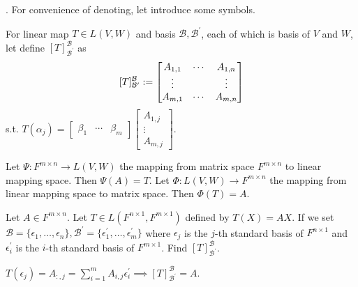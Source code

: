 \documentclass[8pt]{beamer}
\newcommand{\mc}[1]{\mathcal{#1}}
\begin{document}
\begin{frame}{.}
    For convenience of denoting, let introduce some symbols.
    \begin{definition}
        For linear map $T \in L(V,W)$ and basis $\mc{B}, \mc{B}^\prime$, each of which is basis of $V$ and $W$, let define $[T]^{\mc{B}}_{\mc{B}^\prime}$ as
        \[
            [T]^{\mc{B}}_{\mc{B}^\prime} := \left[\begin{matrix}
                A_{1,1} & \cdots & A_{1,n} \\ \vdots & \empty & \vdots \\ A_{m,1} & \cdots & A_{m,n}
            \end{matrix}\right]
        \]
        s.t. $ T(\alpha_j) = \left[\begin{matrix} \beta_1 & \cdots & \beta_m \end{matrix}\right] \left[\begin{matrix}
            A_{1,j} \\ \vdots \\ A_{m,j}
        \end{matrix}\right]$.

        Let $\Psi : F^{m \times n} \to L(V,W)$ the mapping from matrix space $F^{m \times n}$ to linear mapping space. 
        Then $\Psi(A) = T$.
        Let $\Phi : L(V,W) \to F^{m \times n}$ the mapping from linear mapping space to matrix space.
        Then $\Phi(T) = A$.

    \end{definition}
    \begin{example}
        Let $A \in F^{m \times n}$.
        Let $T \in L(F^{n \times 1}, F^{m \times 1})$ defined by $T(X) = AX$.
        If we set $\mc{B} = \{\epsilon_1, \dots, \epsilon_n\}, \mc{B}^\prime = \{\epsilon^\prime_1, \dots, \epsilon^\prime_m\}$ where $\epsilon_j$ is the $j$-th standard basis of $F^{n \times 1}$ and $\epsilon^\prime_i$ is the $i$-th standard basis of $F^{m \times 1}$.
        Find $[T]^{\mc{B}}_{\mc{B}^\prime}$.
    \end{example}
    
    $T(\epsilon_j) = A_{:,j} = \sum_{i=1}^m A_{i,j} \epsilon^\prime_{i} \implies [T]^{\mc{B}}_{\mc{B}^\prime} = A$.
\end{frame}
\end{document}
